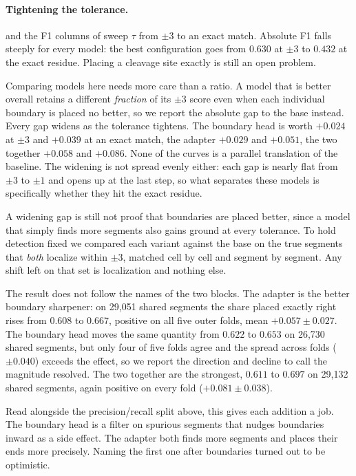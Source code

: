 \documentclass{article}
\begin{document}
\paragraph{Tightening the tolerance.}  and the F1 columns of  sweep $\tau$ from $\pm3$ to an exact match. Absolute F1 falls steeply for every model: the best configuration goes from $0.630$ at $\pm3$ to $0.432$ at the exact residue. Placing a cleavage site exactly is still an open problem.

Comparing models here needs more care than a ratio. A model that is better overall retains a different \emph{fraction} of its $\pm3$ score even when each individual boundary is placed no better, so we report the absolute gap to the base instead. Every gap widens as the tolerance tightens. The boundary head is worth $+0.024$ at $\pm3$ and $+0.039$ at an exact match, the adapter $+0.029$ and $+0.051$, the two together $+0.058$ and $+0.086$. None of the curves is a parallel translation of the baseline. The widening is not spread evenly either: each gap is nearly flat from $\pm3$ to $\pm1$ and opens up at the last step, so what separates these models is specifically whether they hit the exact residue.

A widening gap is still not proof that boundaries are placed better, since a model that simply finds more segments also gains ground at every tolerance. To hold detection fixed we compared each variant against the base on the true segments that \emph{both} localize within $\pm3$, matched cell by cell and segment by segment. Any shift left on that set is localization and nothing else.

The result does not follow the names of the two blocks. The adapter is the better boundary sharpener: on 29{,}051 shared segments the share placed exactly right rises from $0.608$ to $0.667$, positive on all five outer folds, mean $+0.057\pm0.027$. The boundary head moves the same quantity from $0.622$ to $0.653$ on 26{,}730 shared segments, but only four of five folds agree and the spread across folds ($\pm0.040$) exceeds the effect, so we report the direction and decline to call the magnitude resolved. The two together are the strongest, $0.611$ to $0.697$ on 29{,}132 shared segments, again positive on every fold ($+0.081\pm0.038$).

Read alongside the precision/recall split above, this gives each addition a job. The boundary head is a filter on spurious segments that nudges boundaries inward as a side effect. The adapter both finds more segments and places their ends more precisely. Naming the first one after boundaries turned out to be optimistic.
\end{document}
